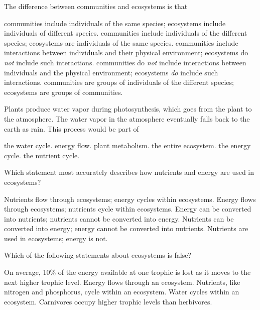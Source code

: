 \question
The difference between communities and ecosystems is that

\begin{choices}
\choice communities include individuals of the same species; ecosystems include individuals of different species.%
\choice communities include individuals of the different species; ecosystems are individuals of the same species.%
\choice communities include interactions between individuals and their physical environment; ecosystems do \emph{not} include such interactions.%
\correctchoice communities do \emph{not} include interactions between individuals and the physical environment; ecosystems \emph{do} include such interactions.%
\choice communities are groups of individuals of the different species; ecosystems are groups of communities.%
\end{choices}

\question
Plants produce water vapor during photosynthesis, which goes from the plant to the atmosphere. The water vapor in the atmosphere eventually falls back to the earth as rain. This process would be part of

\begin{choices}
\correctchoice the water cycle.%
\choice energy flow.%
\choice plant metabolism.%
\choice the entire ecosystem.%
\choice the energy cycle.%
\choice the nutrient cycle.%
\end{choices}

\question
Which statement most accurately describes how nutrients and energy are used in ecosystems?

\begin{choices}
\choice Nutrients flow through ecosystems; energy cycles within ecosystems. %
\correctchoice Energy flows through ecosystems; nutrients cycle within ecosystems. %
\choice Energy can be converted into nutrients; nutrients cannot be converted into energy. %
\choice Nutrients can be converted into energy; energy cannot be converted into nutrients. %
\choice Nutrients are used in ecosystems; energy is not. %
\end{choices}


\question
Which of the following statements about ecosystems is false?

\begin{choices}
\correctchoice On average, 10\% of the energy available at one trophic is lost as it moves to the next higher trophic level. %
\choice Energy flows through an ecosystem. %
\choice Nutrients, like nitrogen and phosphorus, cycle within an ecosystem. %
\choice Water cycles within an ecosystem. %
\choice Carnivores occupy higher trophic levels than herbivores. %
\end{choices}


